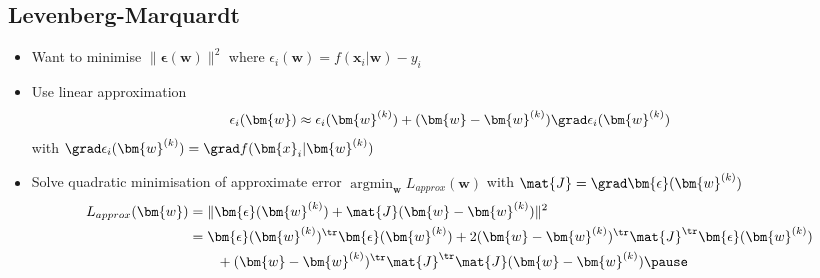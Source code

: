 
\begin{slide}
\section[-2]{Levenberg-Marquardt}

\begin{PauseHighLight}
  \begin{itemize}
  \item Want to minimise $\|\bm{\epsilon}(\bm{w})\|^2$ where
    $\epsilon_i(\bm{w}) =  f(\bm{x}_i|\bm{w}) - y_i$\pause
  \item Use linear approximation
    \begin{align*}
      \epsilon_i(\bm{w}) \approx \epsilon_i(\bm{w}^{(k)}) +
      (\bm{w}-\bm{w}^{(k)}) \grad \epsilon_i(\bm{w}^{(k)})
    \end{align*}
    with $\grad \epsilon_i(\bm{w}^{(k)}) = \grad f(\bm{x}_i|\bm{w}^{(k)})$\pause
  \item Solve quadratic minimisation of approximate error
    $\mathop{\mathrm{argmin}}_{\bm{w}} 
    L_{approx}(\bm{w})$ with $\mat{J}=\grad \bm{\epsilon}(\bm{w}^{(k)})$
    \begin{align*}
      L_{approx}(\bm{w}) &= 
      \| \bm{\epsilon}(\bm{w}^{(k)}) +
      \mat{J} (\bm{w}-\bm{w}^{(k)}) \|^2 \\
      &=
      \bm{\epsilon}(\bm{w}^{(k)})^\tr\bm{\epsilon}(\bm{w}^{(k)})
      + 2 (\bm{w}-\bm{w}^{(k)})^\tr \mat{J}^\tr
      \bm{\epsilon}(\bm{w}^{(k)}) \\
      &\hspace{2em}
      + (\bm{w}-\bm{w}^{(k)})^\tr \mat{J}^\tr \mat{J} (\bm{w}-\bm{w}^{(k)})
      \pause
    \end{align*}
  \end{itemize}
\end{PauseHighLight}

\end{slide}


